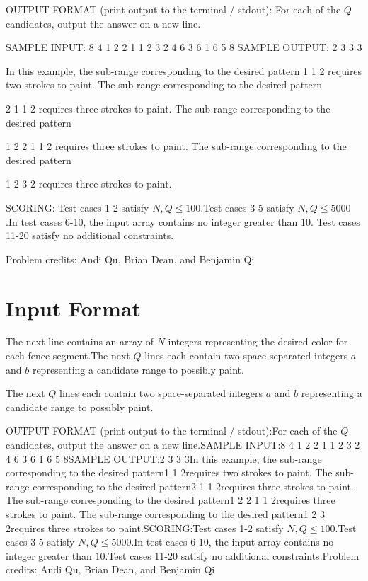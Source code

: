 \documentclass[12pt]{article}
\begin{document}
OUTPUT FORMAT (print output to the terminal / stdout):
For each of the $Q$ candidates, output the answer on a new line.

SAMPLE INPUT:
8 4
1 2 2 1 1 2 3 2
4 6
3 6
1 6
5 8
SAMPLE OUTPUT: 
2
3
3
3

In this example, the sub-range corresponding to the desired pattern  
1 1 2 
requires two strokes to paint. The sub-range corresponding to the desired
pattern  

2 1 1 2
requires three strokes to paint.  The sub-range corresponding to the desired
pattern

1 2 2 1 1 2
requires three strokes to paint. The sub-range corresponding to the desired
pattern

1 2 3 2
requires three strokes to paint.

SCORING:
Test cases 1-2 satisfy $N,Q\le 100$.Test cases 3-5 satisfy $N,Q\le 5000$.In test cases 6-10, the input array contains no integer greater than $10$.
Test cases 11-20 satisfy no additional constraints.


Problem credits: Andi Qu, Brian Dean, and Benjamin Qi



\section*{Input Format}
The next line contains an array of $N$ integers representing the desired color 
for each fence segment.The next $Q$ lines each contain two space-separated integers $a$ and $b$
representing a candidate range to possibly paint.

The next $Q$ lines each contain two space-separated integers $a$ and $b$
representing a candidate range to possibly paint.

OUTPUT FORMAT (print output to the terminal / stdout):For each of the $Q$ candidates, output the answer on a new line.SAMPLE INPUT:8 4
1 2 2 1 1 2 3 2
4 6
3 6
1 6
5 8SAMPLE OUTPUT:2
3
3
3In this example, the sub-range corresponding to the desired pattern1 1 2requires two strokes to paint. The sub-range corresponding to the desired
pattern2 1 1 2requires three strokes to paint.  The sub-range corresponding to the desired
pattern1 2 2 1 1 2requires three strokes to paint. The sub-range corresponding to the desired
pattern1 2 3 2requires three strokes to paint.SCORING:Test cases 1-2 satisfy $N,Q\le 100$.Test cases 3-5 satisfy $N,Q\le 5000$.In test cases 6-10, the input array contains no integer greater than $10$.Test cases 11-20 satisfy no additional constraints.Problem credits: Andi Qu, Brian Dean, and Benjamin Qi
\end{document}
